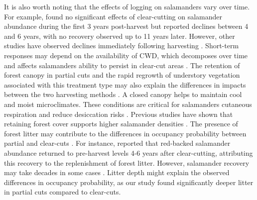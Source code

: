 It is also worth noting that the effects of logging on salamanders vary over time. 
For example, \cite{Ochs2022Responseterrestrial} found no significant effects of clear-cutting on salamander abundance during the first 3 years post-harvest but reported declines between 4 and 6 years, with no recovery observed up to 11 years later. 
However, other studies have observed declines immediately following harvesting \citep{deMaynadier1995relationshipforest,Macneil2014Effectstimber}. 
Short-term responses may depend on the availability of CWD, which decomposes over time and affects salamanders ability to persist in clear-cut areas \citep{Ochs2022Responseterrestrial}. 
The retention of forest canopy in partial cuts and the rapid regrowth of understory vegetation associated with this treatment type may also explain the differences in impacts between the two harvesting methods \citep{Raybuck2015silviculturalpractices}. 
A closed canopy helps to maintain cool and moist microclimates. 
These conditions are critical for salamanders cutaneous respiration and reduce desiccation risks \citep{Homyack2011Energeticssurface}. 
Previous studies have shown that retaining forest cover supports higher salamander densities \citep{Hocking2013Effectsexperimental,Harper2015Impactforestry,Mahoney2016Woodlandsalamander}. 
The presence of forest litter may contribute to the differences in occupancy probability between partial and clear-cuts \citep{tilghmanMetaanalysisEffectsCanopy2012}. 
For instance, \cite{Ash1997DisappearanceReturn} reported that red-backed salamander abundance returned to pre-harvest levels 4-6 years after clear-cutting, attributing this recovery to the replenishment of forest litter. 
However, salamander recovery may take decades in some cases \citep{Homyack2013Effectsrepeatedstand,Ochs2022Responseterrestrial}. 
Litter depth might explain the observed differences in occupancy probability, as our study found significantly deeper litter in partial cuts compared to clear-cuts. 



